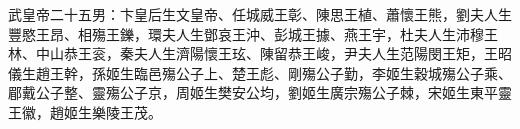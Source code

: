 \begin{pinyinscope}
 
 
 武皇帝二十五男：卞皇后生文皇帝、任城威王彰、陳思王植、蕭懷王熊，劉夫人生豐愍王昂、相殤王鑠，環夫人生鄧哀王沖、彭城王據、燕王宇，杜夫人生沛穆王林、中山恭王衮，秦夫人生濟陽懷王玹、陳留恭王峻，尹夫人生范陽閔王矩，王昭儀生趙王幹，孫姬生臨邑殤公子上、楚王彪、剛殤公子勤，李姬生穀城殤公子乘、郿戴公子整、靈殤公子京，周姬生樊安公均，劉姬生廣宗殤公子棘，宋姬生東平靈王徽，趙姬生樂陵王茂。
 
 
\end{pinyinscope}